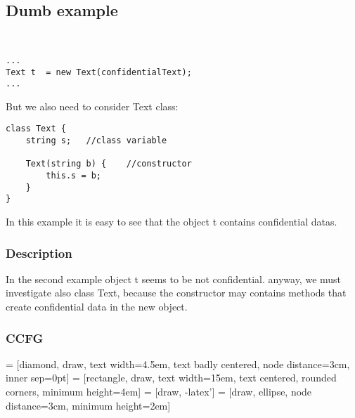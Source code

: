 \documentclass[letterpaper,twocolumn,10pt]{article}
\begin{document}
\subsection{Dumb example}
{\tt \small
\begin{verbatim}
...
Text t	= new Text(confidentialText);
...
\end{verbatim}
}
But we also need to consider Text class: \\

\begin{verbatim}
class Text {
    string s;	//class variable
	
    Text(string b) { 	//constructor
        this.s = b;
    }
}
\end{verbatim}

In this example it is easy to see that the object t contains confidential datas.\\


\subsubsection{Description}
In the second example object t seems to be not confidential. anyway, we must investigate also class Text, because the constructor may contains methods that create confidential data in the new object.

\subsubsection{CCFG}
 = [diamond, draw, 
    text width=4.5em, text badly centered, node distance=3cm, inner sep=0pt]
 = [rectangle, draw, 
    text width=15em, text centered, rounded corners, minimum height=4em]
 = [draw, -latex']
 = [draw, ellipse, node distance=3cm,
    minimum height=2em]
\begin{center}
\end{center}
\end{document}
